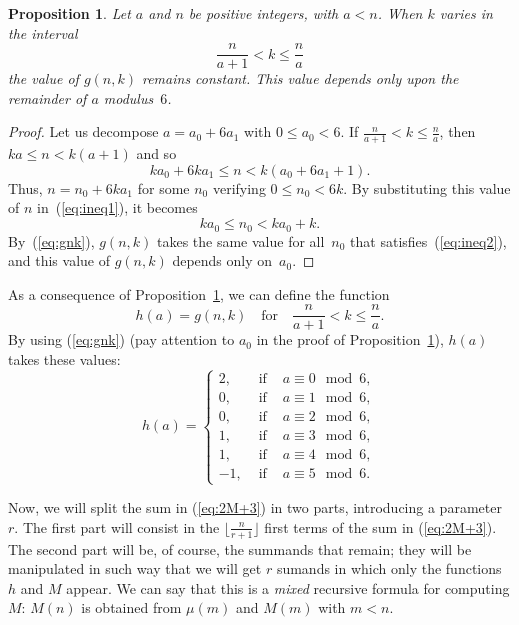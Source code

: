 \documentclass[10pt]{amsart}
\newtheorem{propo}[theor]{Proposition}
\begin{document}
\begin{propo}
\label{th:gnkct}
Let $a$ and $n$ be positive integers, with $a<n$.
When $k$ varies in the interval
$$
\frac{n}{a+1} < k \leq \frac na
$$
the value of $g(n,k)$ remains constant. This value depends only
upon the remainder of $a$ modulus~$6$.
\end{propo}

\begin{proof}
Let us decompose $a = a_0+6a_1$ with $0 \leq a_0 < 6$.
If $\frac {n}{a+1}<k\leq \frac na$, then
$ka \leq n < k(a+1)$ and so
\begin{equation}
\label{eq:ineq1}
ka_0+6ka_1 \leq n < k(a_0+6a_1+1).
\end{equation}
Thus, $n = n_0+6ka_1$ for some $n_0$ verifying $0 \leq n_0 < 6k$.
By substituting this value of $n$ in~(\ref{eq:ineq1}), it becomes
\begin{equation}
\label{eq:ineq2}
ka_0 \leq n_0 < ka_0+k.
\end{equation}
By~(\ref{eq:gnk}), $g(n,k)$ takes the same value for all~$n_0$
that satisfies~(\ref{eq:ineq2}), and this value of $g(n,k)$ depends
only on~$a_0$.
\end{proof}

As a consequence of Proposition~\ref{th:gnkct}, we can define
the function
\begin{equation}
\label{eq:h=g}
h(a) = g(n,k) \quad \mbox{for}\quad \frac{n}{a+1} < k \leq \frac na.
\end{equation}
By using (\ref{eq:gnk}) (pay attention to $a_0$ in the proof
of Proposition~\ref{th:gnkct}), $h(a)$ takes these values:
\begin{equation}
\label{eq:h(a)}
h(a) = \left\{
\begin{array}{lll}
2, & \mbox{ if }& a\equiv 0 \mod 6, \\
0, & \mbox{ if }& a\equiv 1 \mod 6, \\
0, & \mbox{ if }& a\equiv 2 \mod 6, \\
1, & \mbox{ if }& a\equiv 3 \mod 6, \\
1, & \mbox{ if }& a\equiv 4 \mod 6, \\
-1, & \mbox{ if }& a\equiv 5 \mod 6.
\end{array}\right.
\end{equation}

Now, we will split the sum in (\ref{eq:2M+3}) in two parts,
introducing a parameter~$r$.
The first part will consist in the $\lfloor\frac{n}{r+1}\rfloor$
first terms of the sum in (\ref{eq:2M+3}). The second part will be,
of course, the summands that remain; they will be manipulated
in such way that we will get $r$ sumands in which only the functions
$h$ and $M$ appear. We can say that this is a \textit{mixed}
recursive formula for computing $M$: $M(n)$ is obtained from
$\mu(m)$ and $M(m)$ with $m<n$.
\end{document}
